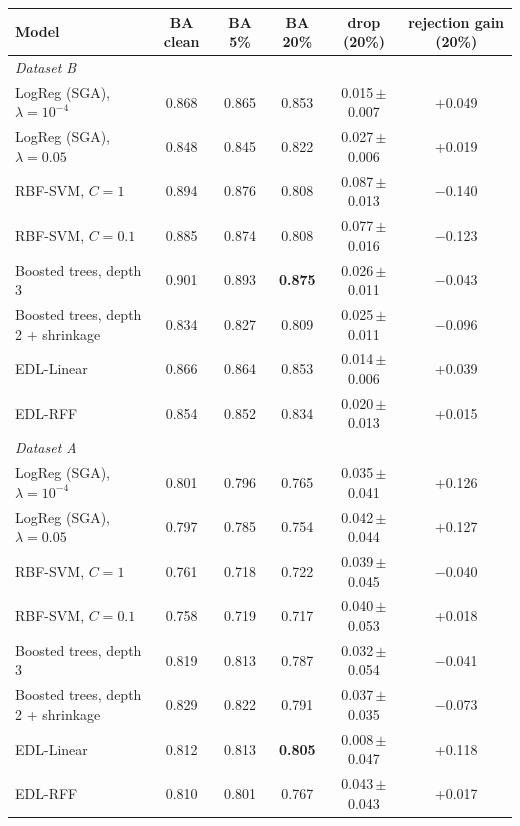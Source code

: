 \begin{tabular}{lccccc}\toprule
Model & BA clean & BA 5\% & BA 20\% & drop (20\%) & rejection gain (20\%)\\\midrule
\multicolumn{6}{l}{\textit{Dataset B}}\\
LogReg (SGA), $\lambda{=}10^{-4}$ & 0.868 & 0.865 & 0.853 & 0.015\,{\scriptsize$\pm$0.007} & +0.049\\
LogReg (SGA), $\lambda{=}0.05$ & 0.848 & 0.845 & 0.822 & 0.027\,{\scriptsize$\pm$0.006} & +0.019\\
RBF-SVM, $C{=}1$ & 0.894 & 0.876 & 0.808 & 0.087\,{\scriptsize$\pm$0.013} & $-$0.140\\
RBF-SVM, $C{=}0.1$ & 0.885 & 0.874 & 0.808 & 0.077\,{\scriptsize$\pm$0.016} & $-$0.123\\
Boosted trees, depth 3 & 0.901 & 0.893 & \textbf{0.875} & 0.026\,{\scriptsize$\pm$0.011} & $-$0.043\\
Boosted trees, depth 2 + shrinkage & 0.834 & 0.827 & 0.809 & 0.025\,{\scriptsize$\pm$0.011} & $-$0.096\\
EDL-Linear & 0.866 & 0.864 & 0.853 & 0.014\,{\scriptsize$\pm$0.006} & +0.039\\
EDL-RFF & 0.854 & 0.852 & 0.834 & 0.020\,{\scriptsize$\pm$0.013} & +0.015\\
\midrule
\multicolumn{6}{l}{\textit{Dataset A}}\\
LogReg (SGA), $\lambda{=}10^{-4}$ & 0.801 & 0.796 & 0.765 & 0.035\,{\scriptsize$\pm$0.041} & +0.126\\
LogReg (SGA), $\lambda{=}0.05$ & 0.797 & 0.785 & 0.754 & 0.042\,{\scriptsize$\pm$0.044} & +0.127\\
RBF-SVM, $C{=}1$ & 0.761 & 0.718 & 0.722 & 0.039\,{\scriptsize$\pm$0.045} & $-$0.040\\
RBF-SVM, $C{=}0.1$ & 0.758 & 0.719 & 0.717 & 0.040\,{\scriptsize$\pm$0.053} & +0.018\\
Boosted trees, depth 3 & 0.819 & 0.813 & 0.787 & 0.032\,{\scriptsize$\pm$0.054} & $-$0.041\\
Boosted trees, depth 2 + shrinkage & 0.829 & 0.822 & 0.791 & 0.037\,{\scriptsize$\pm$0.035} & $-$0.073\\
EDL-Linear & 0.812 & 0.813 & \textbf{0.805} & 0.008\,{\scriptsize$\pm$0.047} & +0.118\\
EDL-RFF & 0.810 & 0.801 & 0.767 & 0.043\,{\scriptsize$\pm$0.043} & +0.017\\

\bottomrule\end{tabular}
